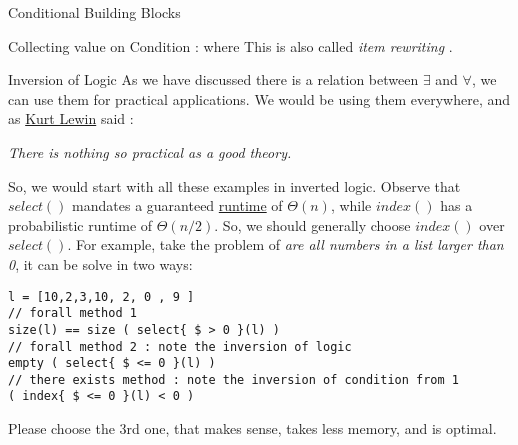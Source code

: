 \begin{section}{Conditional Building Blocks}
\begin{subsection}{Collecting value on Condition : where }
This is also called \emph{item rewriting} .
\end{subsection}

\begin{subsection}{Inversion of Logic}
As we have discussed there is a relation between $\exists$ and $\forall$, 
we can use them for practical applications. We would be using them everywhere, 
and as \href{http://psychology.about.com/od/psychologyquotes/a/lewinquotes.htm}{Kurt Lewin} said :
\begin{center}
\emph{There is nothing so practical as a good theory.}
\end{center}
So, we would start with all these examples in inverted logic.
Observe that $select()$ mandates a guaranteed \href{https://en.wikipedia.org/wiki/Big_O_notation}{runtime} of $\Theta(n)$,
while $index()$ has a probabilistic runtime of $\Theta(n/2)$. So, we should generally choose $index()$ over $select()$.
For example, take the problem of \emph{are all numbers in a list larger than 0}, it can be solve in two ways:

\begin{center}\begin{minipage}{\linewidth}
\begin{lstlisting}[style=JexlStyle]
l = [10,2,3,10, 2, 0 , 9 ]
// forall method 1
size(l) == size ( select{ $ > 0 }(l) )    
// forall method 2 : note the inversion of logic 
empty ( select{ $ <= 0 }(l) )    
// there exists method : note the inversion of condition from 1
( index{ $ <= 0 }(l) < 0 )
\end{lstlisting}\end{minipage}
\end{center}

Please choose the 3rd one, that makes sense, takes less memory, and is optimal.    
\end{subsection}

\end{section}

